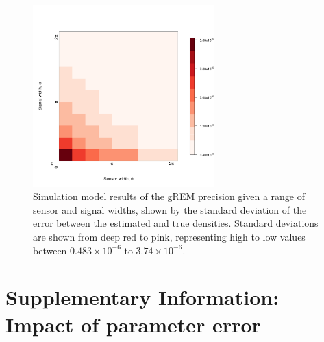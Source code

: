 \documentclass[a4paper,10pt,reqno,oneside]{amsart}
\begin{document}
\begin{figure}[h!]
	\includegraphics[width=7cm]{../imgs/ResultStandardDeviation.pdf}
	\caption{Simulation model results of the gREM precision given a range of sensor and signal widths, shown by the standard deviation of the error between the estimated and true densities. Standard deviations are shown from deep red to pink, representing high to low values between $0.483\times10^{-6}$ to $3.74\times10^{-6}$. 
        } 
	\label{f:StandardDeviation}
\end{figure}


\clearpage
\section{Supplementary Information: Impact of parameter error}
\setcounter{figure}{0}    
\end{document}
